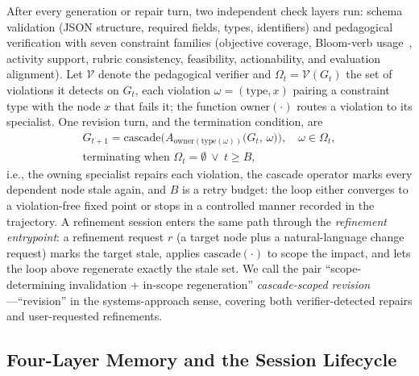 After every generation or repair turn, two independent check layers run: schema validation (JSON structure, required fields, types, identifiers) and pedagogical verification with seven constraint families (objective coverage, Bloom-verb usage~\cite{anderson2001taxonomy}, activity support, rubric consistency, feasibility, actionability, and evaluation alignment). Let $\mathcal{V}$ denote the pedagogical verifier and $\Omega_t = \mathcal{V}(G_t)$ the set of violations it detects on $G_t$, each violation $\omega = (\mathrm{type}, x)$ pairing a constraint type with the node $x$ that fails it; the function $\mathrm{owner}(\cdot)$ routes a violation to its specialist. One revision turn, and the termination condition, are
\begin{gather*}
G_{t+1} = \mathrm{cascade}\Big(A_{\mathrm{owner}(\mathrm{type}(\omega))}\big(G_t,\, \omega\big)\Big), \quad \omega \in \Omega_t,\\
\text{terminating when } \Omega_t = \emptyset \ \lor\ t \geq B,
\end{gather*}
i.e., the owning specialist repairs each violation, the cascade operator marks every dependent node stale again, and $B$ is a retry budget: the loop either converges to a violation-free fixed point or stops in a controlled manner recorded in the trajectory. A refinement session enters the same path through the \emph{refinement entrypoint}: a refinement request $r$ (a target node plus a natural-language change request) marks the target stale, applies $\mathrm{cascade}(\cdot)$ to scope the impact, and lets the loop above regenerate exactly the stale set. We call the pair ``scope-determining invalidation + in-scope regeneration'' \emph{cascade-scoped revision}---``revision'' in the systems-approach sense, covering both verifier-detected repairs and user-requested refinements.

\subsection{Four-Layer Memory and the Session Lifecycle}
\label{sec:memory}

